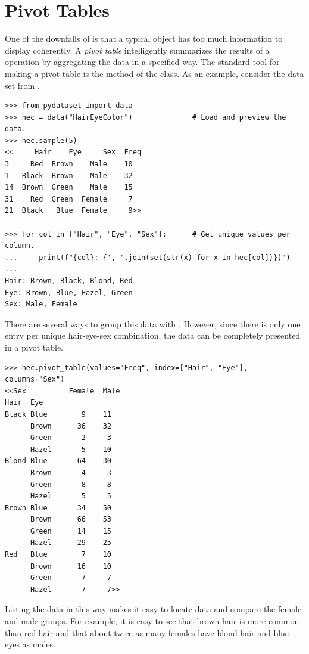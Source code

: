 \section*{Pivot Tables} %

One of the downfalls of  is that a typical  object has too much information to display coherently.
A \emph{pivot table} intelligently summarizes the results of a  operation by aggregating the data in a specified way.
The standard tool for making a pivot table is the  method of the  class.
As an example, consider the  data set from .

\begin{lstlisting}
>>> from pydataset import data
>>> hec = data("HairEyeColor")              # Load and preview the data.
>>> hec.sample(5)
<<     Hair    Eye     Sex  Freq
3     Red  Brown    Male    10
1   Black  Brown    Male    32
14  Brown  Green    Male    15
31    Red  Green  Female     7
21  Black   Blue  Female     9>>

>>> for col in ["Hair", "Eye", "Sex"]:      # Get unique values per column.
...     print(f"{col}: {', '.join(set(str(x) for x in hec[col])})")
...
Hair: Brown, Black, Blond, Red
Eye: Brown, Blue, Hazel, Green
Sex: Male, Female
\end{lstlisting}

There are several ways to group this data with .
However, since there is only one entry per unique hair-eye-sex combination, the data can be completely presented in a pivot table.

\begin{lstlisting}
>>> hec.pivot_table(values="Freq", index=["Hair", "Eye"], columns="Sex")
<<Sex          Female  Male
Hair  Eye
Black Blue        9    11
      Brown      36    32
      Green       2     3
      Hazel       5    10
Blond Blue       64    30
      Brown       4     3
      Green       8     8
      Hazel       5     5
Brown Blue       34    50
      Brown      66    53
      Green      14    15
      Hazel      29    25
Red   Blue        7    10
      Brown      16    10
      Green       7     7
      Hazel       7     7>>
\end{lstlisting}

Listing the data in this way makes it easy to locate data and compare the female and male groups.
For example, it is easy to see that brown hair is more common than red hair and that about twice as many females have blond hair and blue eyes as males.

